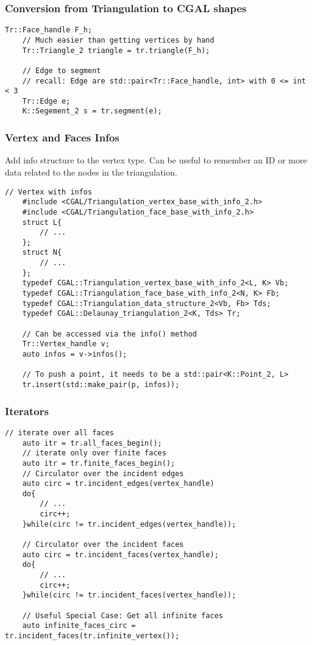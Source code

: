 \documentclass{article}
\begin{document}
\subsubsection{Conversion from Triangulation to CGAL shapes}
\begin{lstlisting}[frame=single]
    Tr::Face_handle F_h;
    // Much easier than getting vertices by hand
    Tr::Triangle_2 triangle = tr.triangle(F_h);
    
    // Edge to segment
    // recall: Edge are std::pair<Tr::Face_handle, int> with 0 <= int < 3
    Tr::Edge e;
    K::Segement_2 s = tr.segment(e);
\end{lstlisting}

\subsubsection{Vertex and Faces Infos}
Add info structure to the vertex type. Can be useful to remember an ID or more data related to the nodes in the triangulation.
\begin{lstlisting}[frame=single]
    // Vertex with infos
    #include <CGAL/Triangulation_vertex_base_with_info_2.h>
    #include <CGAL/Triangulation_face_base_with_info_2.h>
    struct L{
        // ...
    };
    struct N{
        // ...
    };
    typedef CGAL::Triangulation_vertex_base_with_info_2<L, K> Vb;
    typedef CGAL::Triangulation_face_base_with_info_2<N, K> Fb;
    typedef CGAL::Triangulation_data_structure_2<Vb, Fb> Tds;
    typedef CGAL::Delaunay_triangulation_2<K, Tds> Tr;
    
    // Can be accessed via the info() method
    Tr::Vertex_handle v;
    auto infos = v->infos();
    
    // To push a point, it needs to be a std::pair<K::Point_2, L>
    tr.insert(std::make_pair(p, infos));
\end{lstlisting}

\subsubsection{Iterators}
    \begin{lstlisting}[frame=single]
    // iterate over all faces
    auto itr = tr.all_faces_begin();
    // iterate only over finite faces
    auto itr = tr.finite_faces_begin();
    // Circulator over the incident edges
    auto circ = tr.incident_edges(vertex_handle)
    do{
        // ...
        circ++;
    }while(circ != tr.incident_edges(vertex_handle));
    
    // Circulator over the incident faces
    auto circ = tr.incident_faces(vertex_handle);
    do{
        // ...
        circ++;
    }while(circ != tr.incident_faces(vertex_handle));
    
    // Useful Special Case: Get all infinite faces
    auto infinite_faces_circ = tr.incident_faces(tr.infinite_vertex());
    \end{lstlisting}
\end{document}
